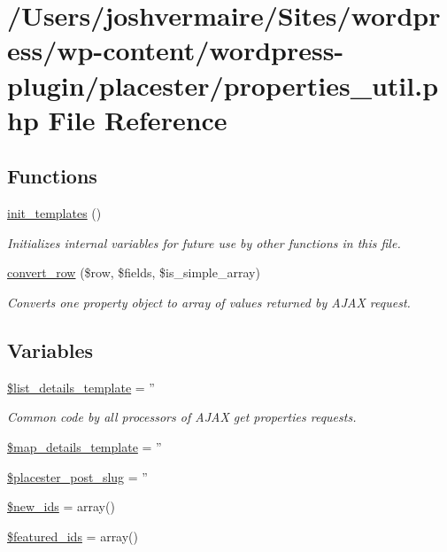 \hypertarget{properties__util_8php}{
\section{/Users/joshvermaire/Sites/wordpress/wp-\/content/wordpress-\/plugin/placester/properties\_\-util.php File Reference}
\label{dd/dcf/properties__util_8php}
}
\subsection*{Functions}
\begin{DoxyCompactItemize}
\item 
\hyperlink{properties__util_8php_a8e84197f86f694182a33834e8f99461b}{init\_\-templates} ()
\begin{DoxyCompactList}\small\item\em Initializes internal variables for future use by other functions in this file. \end{DoxyCompactList}\item 
\hyperlink{properties__util_8php_a9ad89bf21bddf01394f0c04794940c29}{convert\_\-row} (\$row, \$fields, \$is\_\-simple\_\-array)
\begin{DoxyCompactList}\small\item\em Converts one property object to array of values returned by AJAX request. \end{DoxyCompactList}\end{DoxyCompactItemize}
\subsection*{Variables}
\begin{DoxyCompactItemize}
\item 
\hyperlink{properties__util_8php_af18ec572060e88a3c3ac49d4a518aa5f}{\$list\_\-details\_\-template} = ''
\begin{DoxyCompactList}\small\item\em Common code by all processors of AJAX get properties requests. \end{DoxyCompactList}\item 
\hyperlink{properties__util_8php_a4f781f91caec0fe7ecacb31bf0bbeef4}{\$map\_\-details\_\-template} = ''
\item 
\hyperlink{properties__util_8php_a00ec83f6ffd6692a8a7d08bacfb1eaca}{\$placester\_\-post\_\-slug} = ''
\item 
\hyperlink{properties__util_8php_ad0519faf169da0d8a1274e832680cdaf}{\$new\_\-ids} = array()
\item 
\hyperlink{properties__util_8php_a26690c08bd8e16d48f58a724c53981e7}{\$featured\_\-ids} = array()
\end{DoxyCompactItemize}


